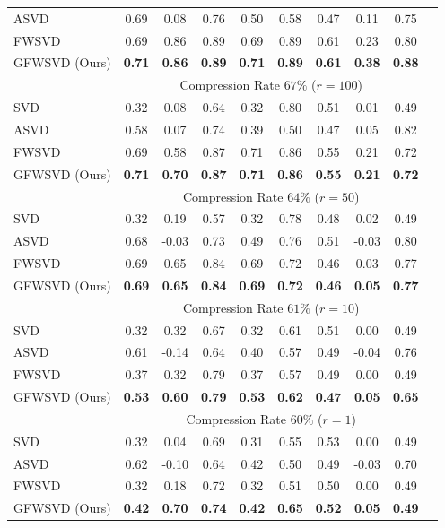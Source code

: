 \documentclass{article}
\begin{document}
\begin{table}[htbp]
\begin{tabular}{l|ccccccccc}
ASVD~\cite{asvd} & 0.69 & 0.08 & 0.76 & 0.50 & 0.58 & 0.47 & 0.11 & 0.75 \\
FWSVD~\cite{FWSVD} & 0.69 & 0.86 & 0.89 & 0.69 & 0.89 & 0.61 & 0.23 & 0.80 \\
GFWSVD (Ours) & \textbf{0.71} & \textbf{0.86} & \textbf{0.89} & \textbf{0.71} & \textbf{0.89} & \textbf{0.61} & \textbf{0.38} & \textbf{0.88} \\
\midrule
& \multicolumn{8}{c}{Compression Rate $67\%$ ($r=100$)} \\
\midrule
SVD & 0.32 & 0.08 & 0.64 & 0.32 & 0.80 & 0.51 & 0.01 & 0.49 \\
ASVD~\cite{asvd} & 0.58 & 0.07 & 0.74 & 0.39 & 0.50 & 0.47 & 0.05 & 0.82 \\
FWSVD~\cite{FWSVD} & 0.69 & 0.58 & 0.87 & 0.71 & 0.86 & 0.55 & 0.21 & 0.72 \\
GFWSVD (Ours) & \textbf{0.71} & \textbf{0.70} & \textbf{0.87} & \textbf{0.71} & \textbf{0.86} & \textbf{0.55} & \textbf{0.21} & \textbf{0.72} \\
\midrule
& \multicolumn{8}{c}{Compression Rate $64\%$ ($r=50$)} \\
\midrule
SVD & 0.32 & 0.19 & 0.57 & 0.32 & 0.78 & 0.48 & 0.02 & 0.49 \\
ASVD~\cite{asvd} & 0.68 & -0.03 & 0.73 & 0.49 & 0.76 & 0.51 & -0.03 & 0.80 \\
FWSVD~\cite{FWSVD} & 0.69 & 0.65 & 0.84 & 0.69 & 0.72 & 0.46 & 0.03 & 0.77 \\
GFWSVD (Ours) & \textbf{0.69} & \textbf{0.65} & \textbf{0.84} & \textbf{0.69} & \textbf{0.72} & \textbf{0.46} & \textbf{0.05} & \textbf{0.77} \\
\midrule
& \multicolumn{8}{c}{Compression Rate $61\%$ ($r=10$)} \\
\midrule
SVD & 0.32 & 0.32 & 0.67 & 0.32 & 0.61 & 0.51 & 0.00 & 0.49 \\
ASVD~\cite{asvd} & 0.61 & -0.14 & 0.64 & 0.40 & 0.57 & 0.49 & -0.04 & 0.76 \\
FWSVD~\cite{FWSVD} & 0.37 & 0.32 & 0.79 & 0.37 & 0.57 & 0.49 & 0.00 & 0.49 \\
GFWSVD (Ours) & \textbf{0.53} & \textbf{0.60} & \textbf{0.79} & \textbf{0.53} & \textbf{0.62} & \textbf{0.47} & \textbf{0.05} & \textbf{0.65} \\
\midrule
& \multicolumn{8}{c}{Compression Rate $60\%$ ($r=1$)} \\
\midrule
SVD & 0.32 & 0.04 & 0.69 & 0.31 & 0.55 & 0.53 & 0.00 & 0.49 \\
ASVD~\cite{asvd} & 0.62 & -0.10 & 0.64 & 0.42 & 0.50 & 0.49 & -0.03 & 0.70 \\
FWSVD~\cite{FWSVD} & 0.32 & 0.18 & 0.72 & 0.32 & 0.51 & 0.50 & 0.00 & 0.49 \\
GFWSVD (Ours) & \textbf{0.42} & \textbf{0.70} & \textbf{0.74} & \textbf{0.42} & \textbf{0.65} & \textbf{0.52} & \textbf{0.05} & \textbf{0.49} \\
\bottomrule
\end{tabular}
\label{tab:glue_extended}
\end{table}
\end{document}
